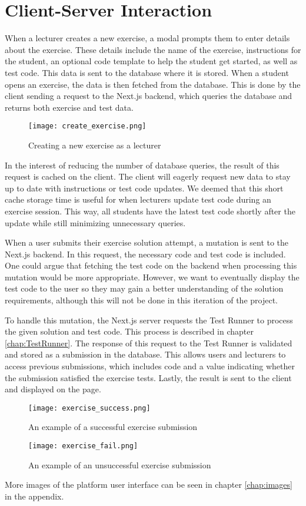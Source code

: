 \section{Client-Server Interaction}
When a lecturer creates a new exercise, a modal prompts them to enter details about the exercise.
These details include the name of the exercise, instructions for the student, an optional code template to help the student get started, as well as test code.
This data is sent to the database where it is stored.
When a student opens an exercise, the data is then fetched from the database.
This is done by the client sending a request to the Next.js backend, which queries the database and returns both exercise and test data.

\begin{figure}[H]
    \centering
    \texttt{[image: create\_exercise.png]}
    \caption{Creating a new exercise as a lecturer}
    \label{fig:create_exercise}
\end{figure}

In the interest of reducing the number of database queries, the result of this request is cached on the client.
The client will eagerly request new data to stay up to date with instructions or test code updates.
We deemed that this short cache storage time is useful for when lecturers update test code during an exercise session.
This way, all students have the latest test code shortly after the update while still minimizing unnecessary queries.

When a user submits their exercise solution attempt, a mutation is sent to the Next.js backend.
In this request, the necessary code and test code is included.
One could argue that fetching the test code on the backend when processing this mutation would be more appropriate.
However, we want to eventually display the test code to the user so they may gain a better understanding of the solution requirements, although this will not be done in this iteration of the project.

To handle this mutation, the Next.js server requests the Test Runner to process the given solution and test code.
This process is described in chapter \ref{chap:TestRunner}.
The response of this request to the Test Runner is validated and stored as a submission in the database.
This allows users and lecturers to access previous submissions, which includes code and a value indicating whether the submission satisfied the exercise tests.
Lastly, the result is sent to the client and displayed on the page.

\begin{figure}[H]
	\texttt{[image: exercise\_success.png]}
	\centering
	\caption{An example of a successful exercise submission}
	\label{fig:exercise_success}
\end{figure}

\begin{figure}[H]
	\texttt{[image: exercise\_fail.png]}
	\centering
	\caption{An example of an unsuccessful exercise submission}
	\label{fig:exercise_fail}
\end{figure}

More images of the platform user interface can be seen in chapter \ref{chap:images} in the appendix.
